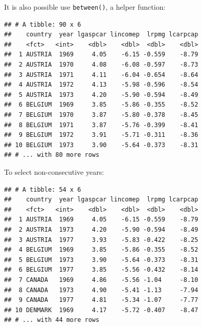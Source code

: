 \documentclass[]{gitbook}
\newenvironment{Shaded}{\begin{snugshade}}{\end{snugshade}}
\newcommand{\DecValTok}[1]{\textcolor[rgb]{0.00,0.00,0.81}{#1}}
\newcommand{\KeywordTok}[1]{\textcolor[rgb]{0.13,0.29,0.53}{\textbf{#1}}}
\newcommand{\NormalTok}[1]{#1}
\newcommand{\OperatorTok}[1]{\textcolor[rgb]{0.81,0.36,0.00}{\textbf{#1}}}
\newcommand{\StringTok}[1]{\textcolor[rgb]{0.31,0.60,0.02}{#1}}
\theoremstyle{definition}
\theoremstyle{definition}
\theoremstyle{definition}
\theoremstyle{remark}
\begin{document}
It is also possible use \texttt{between()}, a helper function:

\begin{Shaded}
\end{Shaded}

\begin{verbatim}
## # A tibble: 90 x 6
##    country  year lgaspcar lincomep  lrpmg lcarpcap
##    <fct>   <int>    <dbl>    <dbl>  <dbl>    <dbl>
##  1 AUSTRIA  1969     4.05    -6.15 -0.559    -8.79
##  2 AUSTRIA  1970     4.08    -6.08 -0.597    -8.73
##  3 AUSTRIA  1971     4.11    -6.04 -0.654    -8.64
##  4 AUSTRIA  1972     4.13    -5.98 -0.596    -8.54
##  5 AUSTRIA  1973     4.20    -5.90 -0.594    -8.49
##  6 BELGIUM  1969     3.85    -5.86 -0.355    -8.52
##  7 BELGIUM  1970     3.87    -5.80 -0.378    -8.45
##  8 BELGIUM  1971     3.87    -5.76 -0.399    -8.41
##  9 BELGIUM  1972     3.91    -5.71 -0.311    -8.36
## 10 BELGIUM  1973     3.90    -5.64 -0.373    -8.31
## # ... with 80 more rows
\end{verbatim}

To select non-consecutive years:

\begin{Shaded}
\end{Shaded}

\begin{verbatim}
## # A tibble: 54 x 6
##    country  year lgaspcar lincomep  lrpmg lcarpcap
##    <fct>   <int>    <dbl>    <dbl>  <dbl>    <dbl>
##  1 AUSTRIA  1969     4.05    -6.15 -0.559    -8.79
##  2 AUSTRIA  1973     4.20    -5.90 -0.594    -8.49
##  3 AUSTRIA  1977     3.93    -5.83 -0.422    -8.25
##  4 BELGIUM  1969     3.85    -5.86 -0.355    -8.52
##  5 BELGIUM  1973     3.90    -5.64 -0.373    -8.31
##  6 BELGIUM  1977     3.85    -5.56 -0.432    -8.14
##  7 CANADA   1969     4.86    -5.56 -1.04     -8.10
##  8 CANADA   1973     4.90    -5.41 -1.13     -7.94
##  9 CANADA   1977     4.81    -5.34 -1.07     -7.77
## 10 DENMARK  1969     4.17    -5.72 -0.407    -8.47
## # ... with 44 more rows
\end{verbatim}
\end{document}
